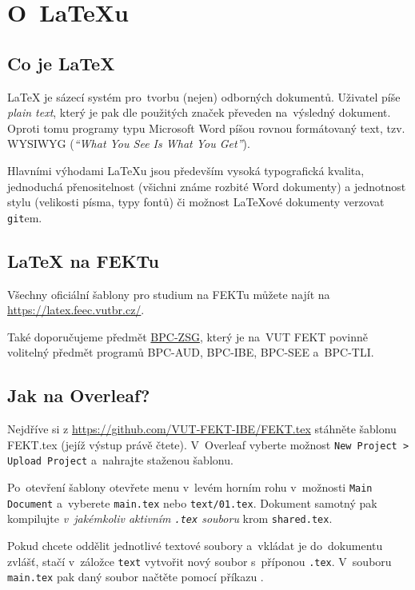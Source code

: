 \clearpage
\section[O~LaTeXu]{O~\LaTeX{}u}

\subsection{Co je \LaTeX}

\LaTeX{} je sázecí systém pro~tvorbu (nejen) odborných dokumentů.
Uživatel píše \emph{plain text}, který je pak dle použitých značek převeden na~výsledný dokument.
Oproti tomu programy typu Microsoft Word píšou rovnou formátovaný text, tzv. WYSIWYG (\emph{\enquote{What You See Is What You Get}}).

Hlavními výhodami \LaTeX{}u jsou především vysoká typografická kvalita, jednoduchá přenositelnost (všichni známe rozbité Word dokumenty) a jednotnost stylu (velikosti písma, typy fontů) či možnost \LaTeX{}ové dokumenty verzovat \texttt{git}em.

\subsection{LaTeX na FEKTu}

Všechny oficiální šablony pro studium na FEKTu můžete najít na~
\url{https://latex.feec.vutbr.cz/}.

Také doporučujeme předmět \href{https://www.vut.cz/studenti/predmety/detail/224331?apid=224331}{BPC-ZSG}, který je na~VUT FEKT povinně volitelný předmět programů BPC-AUD, BPC-IBE, BPC-SEE a~BPC-TLI.

\subsection{Jak na Overleaf?}

Nejdříve si z \url{https://github.com/VUT-FEKT-IBE/FEKT.tex}
stáhněte šablonu FEKT.tex (jejíž výstup právě čtete).
V~Overleaf vyberte možnost \texttt{New Project > Upload Project} a~nahrajte staženou šablonu.

Po~otevření šablony otevřete menu v~levém horním rohu v~možnosti \texttt{Main Document} a~vyberete \texttt{main.tex} nebo \texttt{text/01.tex}.
Dokument samotný pak kompilujte \emph{v~jakémkoliv aktivním \texttt{.tex} souboru} krom \texttt{shared.tex}.

Pokud chcete oddělit jednotlivé textové soubory a~vkládat je do~dokumentu zvlášť, stačí v~záložce \texttt{text} vytvořit nový soubor s~příponou \texttt{.tex}.
V~souboru \texttt{main.tex} pak daný soubor načtěte pomocí příkazu \verb||.

